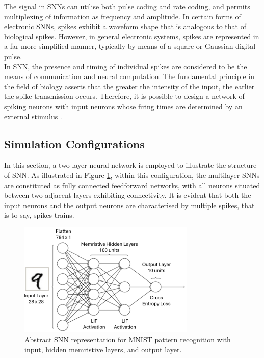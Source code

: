 \noindent The signal in SNNs can utilise both pulse coding and rate coding, and permits multiplexing of information as frequency and amplitude. In certain forms of electronic SNNs, spikes exhibit a waveform shape that is analogous to that of biological spikes. However, in general electronic systems, spikes are represented in a far more simplified manner, typically by means of a square or Gaussian digital pulse. \\

\noindent In SNN, the presence and timing of individual spikes are considered to be the means of communication and neural computation. The fundamental principle in the field of biology asserts that the greater the intensity of the input, the earlier the spike transmission occurs. Therefore, it is possible to design a network of spiking neurons with input neurons whose firing times are determined by an external stimulus \cite{serrano2013stdp}.

\subsection[Simulation Configurations]{Simulation Configurations}

In this section, a two-layer neural network is employed to illustrate the structure of SNN. As illustrated in Figure \ref{fig:6i}, within this configuration, the multilayer SNNs are constituted as fully connected feedforward networks, with all neurons situated between two adjacent layers exhibiting connectivity. It is evident that both the input neurons and the output neurons are characterised by multiple spikes, that is to say, spikes trains. \\

\begin{figure}[htbp!] 
    \centering    
    \includegraphics[width=0.75\textwidth]{Chapter6/Figs/i.png}
    \caption[Abstract SNN representation for MNIST pattern recognition with input, hidden memristive
    layers, and output layer.]{Abstract SNN representation for MNIST pattern recognition with input, hidden memristive
    layers, and output layer.}
    \label{fig:6i}
\end{figure}

